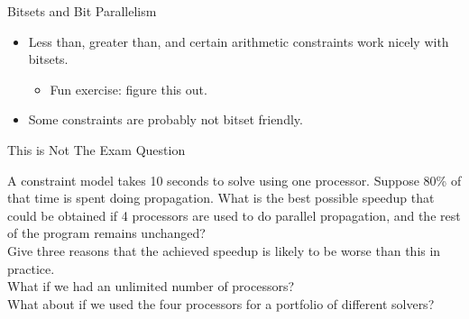 \documentclass{beamer}
\begin{document}
\begin{frame}{Bitsets and Bit Parallelism}
{\begin{itemize}
            \item Less than, greater than, and certain arithmetic constraints work nicely with
                bitsets.
                \begin{itemize}
                    \item Fun exercise: figure this out.
                \end{itemize}

            \item Some constraints are probably not bitset friendly.
        \end{itemize}
    }
\end{frame}

\begin{frame}{This is Not The Exam Question}

    A constraint model takes 10 seconds to solve using one processor. Suppose 80\% of that time is
    spent doing propagation. What is the best possible speedup that could be obtained if 4
    processors are used to do parallel propagation, and the rest of the program remains
    unchanged?
    \\[0.5cm]

    Give three reasons that the achieved speedup is likely to be worse than this in practice.
    \\[0.5cm]

    What if we had an unlimited number of processors? \\[0.5cm]

    What about if we used the four processors for a portfolio of different solvers?

\end{frame}

\end{document}
